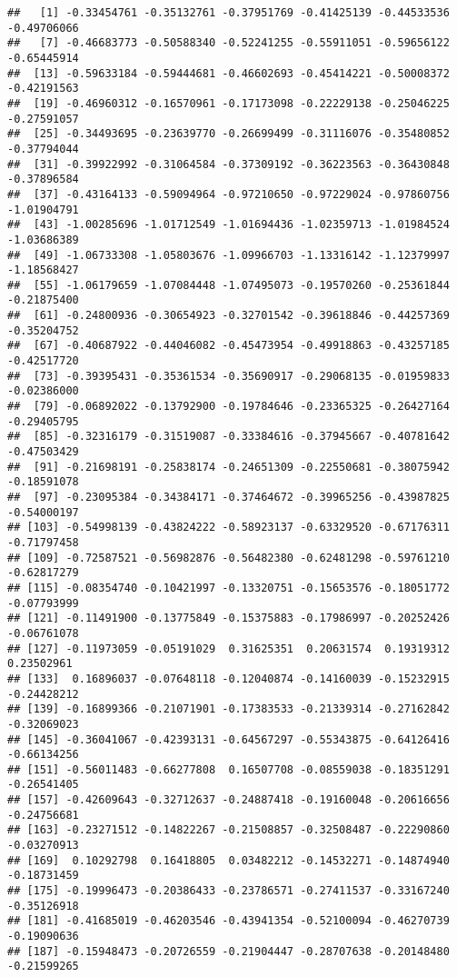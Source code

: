 \documentclass[
]{article}
\begin{document}
\begin{verbatim}
##   [1] -0.33454761 -0.35132761 -0.37951769 -0.41425139 -0.44533536 -0.49706066
##   [7] -0.46683773 -0.50588340 -0.52241255 -0.55911051 -0.59656122 -0.65445914
##  [13] -0.59633184 -0.59444681 -0.46602693 -0.45414221 -0.50008372 -0.42191563
##  [19] -0.46960312 -0.16570961 -0.17173098 -0.22229138 -0.25046225 -0.27591057
##  [25] -0.34493695 -0.23639770 -0.26699499 -0.31116076 -0.35480852 -0.37794044
##  [31] -0.39922992 -0.31064584 -0.37309192 -0.36223563 -0.36430848 -0.37896584
##  [37] -0.43164133 -0.59094964 -0.97210650 -0.97229024 -0.97860756 -1.01904791
##  [43] -1.00285696 -1.01712549 -1.01694436 -1.02359713 -1.01984524 -1.03686389
##  [49] -1.06733308 -1.05803676 -1.09966703 -1.13316142 -1.12379997 -1.18568427
##  [55] -1.06179659 -1.07084448 -1.07495073 -0.19570260 -0.25361844 -0.21875400
##  [61] -0.24800936 -0.30654923 -0.32701542 -0.39618846 -0.44257369 -0.35204752
##  [67] -0.40687922 -0.44046082 -0.45473954 -0.49918863 -0.43257185 -0.42517720
##  [73] -0.39395431 -0.35361534 -0.35690917 -0.29068135 -0.01959833 -0.02386000
##  [79] -0.06892022 -0.13792900 -0.19784646 -0.23365325 -0.26427164 -0.29405795
##  [85] -0.32316179 -0.31519087 -0.33384616 -0.37945667 -0.40781642 -0.47503429
##  [91] -0.21698191 -0.25838174 -0.24651309 -0.22550681 -0.38075942 -0.18591078
##  [97] -0.23095384 -0.34384171 -0.37464672 -0.39965256 -0.43987825 -0.54000197
## [103] -0.54998139 -0.43824222 -0.58923137 -0.63329520 -0.67176311 -0.71797458
## [109] -0.72587521 -0.56982876 -0.56482380 -0.62481298 -0.59761210 -0.62817279
## [115] -0.08354740 -0.10421997 -0.13320751 -0.15653576 -0.18051772 -0.07793999
## [121] -0.11491900 -0.13775849 -0.15375883 -0.17986997 -0.20252426 -0.06761078
## [127] -0.11973059 -0.05191029  0.31625351  0.20631574  0.19319312  0.23502961
## [133]  0.16896037 -0.07648118 -0.12040874 -0.14160039 -0.15232915 -0.24428212
## [139] -0.16899366 -0.21071901 -0.17383533 -0.21339314 -0.27162842 -0.32069023
## [145] -0.36041067 -0.42393131 -0.64567297 -0.55343875 -0.64126416 -0.66134256
## [151] -0.56011483 -0.66277808  0.16507708 -0.08559038 -0.18351291 -0.26541405
## [157] -0.42609643 -0.32712637 -0.24887418 -0.19160048 -0.20616656 -0.24756681
## [163] -0.23271512 -0.14822267 -0.21508857 -0.32508487 -0.22290860 -0.03270913
## [169]  0.10292798  0.16418805  0.03482212 -0.14532271 -0.14874940 -0.18731459
## [175] -0.19996473 -0.20386433 -0.23786571 -0.27411537 -0.33167240 -0.35126918
## [181] -0.41685019 -0.46203546 -0.43941354 -0.52100094 -0.46270739 -0.19090636
## [187] -0.15948473 -0.20726559 -0.21904447 -0.28707638 -0.20148480 -0.21599265

\end{verbatim}
\end{document}
